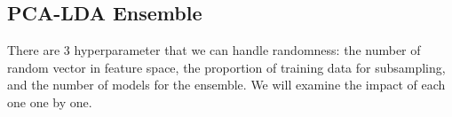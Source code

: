 
\subsection{PCA-LDA Ensemble}

There are 3 hyperparameter that we can handle randomness: the number of random vector in feature space, the proportion of training data for subsampling, and the number of models for the ensemble. We will examine the impact of each one one by one.

